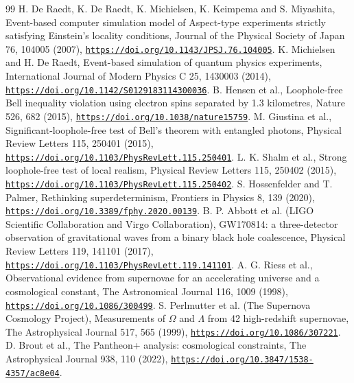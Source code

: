 \documentclass[pdflatex,sn-mathphys-num]{sn-jnl}
\theoremstyle{thmstyleone}
\begin{document}
\begin{thebibliography}{99}
 H. De Raedt, K. De Raedt, K. Michielsen, K. Keimpema and S. Miyashita, Event-based computer simulation model of Aspect-type experiments strictly satisfying Einstein's locality conditions, Journal of the Physical Society of Japan 76, 104005 (2007), \href{https://doi.org/10.1143/JPSJ.76.104005}{\nolinkurl{https://doi.org/10.1143/JPSJ.76.104005}}.
 K. Michielsen and H. De Raedt, Event-based simulation of quantum physics experiments, International Journal of Modern Physics C 25, 1430003 (2014), \href{https://doi.org/10.1142/S0129183114300036}{\nolinkurl{https://doi.org/10.1142/S0129183114300036}}.
 B. Hensen et al., Loophole-free Bell inequality violation using electron spins separated by 1.3 kilometres, Nature 526, 682 (2015), \href{https://doi.org/10.1038/nature15759}{\nolinkurl{https://doi.org/10.1038/nature15759}}.
 M. Giustina et al., Significant-loophole-free test of Bell's theorem with entangled photons, Physical Review Letters 115, 250401 (2015), \href{https://doi.org/10.1103/PhysRevLett.115.250401}{\nolinkurl{https://doi.org/10.1103/PhysRevLett.115.250401}}.
 L. K. Shalm et al., Strong loophole-free test of local realism, Physical Review Letters 115, 250402 (2015), \href{https://doi.org/10.1103/PhysRevLett.115.250402}{\nolinkurl{https://doi.org/10.1103/PhysRevLett.115.250402}}.
 S. Hossenfelder and T. Palmer, Rethinking superdeterminism, Frontiers in Physics 8, 139 (2020), \href{https://doi.org/10.3389/fphy.2020.00139}{\nolinkurl{https://doi.org/10.3389/fphy.2020.00139}}.
 B. P. Abbott et al. (LIGO Scientific Collaboration and Virgo Collaboration), GW170814: a three-detector observation of gravitational waves from a binary black hole coalescence, Physical Review Letters 119, 141101 (2017), \href{https://doi.org/10.1103/PhysRevLett.119.141101}{\nolinkurl{https://doi.org/10.1103/PhysRevLett.119.141101}}.
 A. G. Riess et al., Observational evidence from supernovae for an accelerating universe and a cosmological constant, The Astronomical Journal 116, 1009 (1998), \href{https://doi.org/10.1086/300499}{\nolinkurl{https://doi.org/10.1086/300499}}.
 S. Perlmutter et al. (The Supernova Cosmology Project), Measurements of $\Omega$ and $\Lambda$ from 42 high-redshift supernovae, The Astrophysical Journal 517, 565 (1999), \href{https://doi.org/10.1086/307221}{\nolinkurl{https://doi.org/10.1086/307221}}.
 D. Brout et al., The Pantheon+ analysis: cosmological constraints, The Astrophysical Journal 938, 110 (2022), \href{https://doi.org/10.3847/1538-4357/ac8e04}{\nolinkurl{https://doi.org/10.3847/1538-4357/ac8e04}}.

\end{thebibliography}
\end{document}
